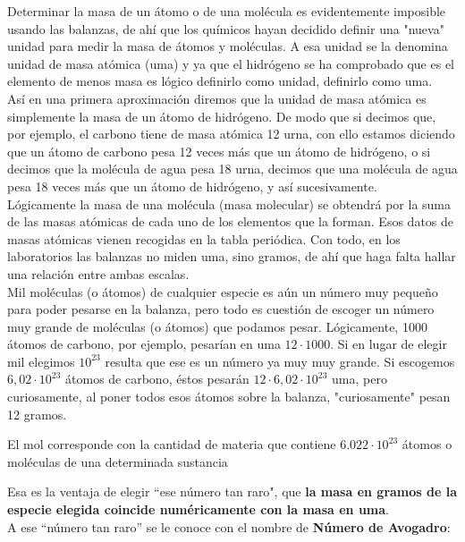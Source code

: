 Determinar la masa de un átomo o de una molécula es evidentemente imposible usando las balanzas, de ahí que los químicos hayan decidido definir una "nueva" unidad para medir la masa de átomos y moléculas. A esa unidad se la denomina unidad de masa atómica (uma) y ya que el hidrógeno se ha comprobado que es el elemento de menos masa es lógico definirlo como unidad, definirlo como uma.\\

Así en una primera aproximación diremos que la unidad de masa atómica es simplemente la masa de un átomo de hidrógeno. De modo que si decimos que, por ejemplo, el carbono tiene de masa atómica 12 urna, con ello estamos diciendo que un átomo de carbono pesa 12 veces más que un átomo de hidrógeno, o si decimos que la molécula de agua pesa 18 urna, decimos que una molécula de agua pesa 18 veces más que un átomo de hidrógeno, y así sucesivamente.\\

Lógicamente la masa de una molécula (masa molecular) se obtendrá por la suma de las masas atómicas de cada uno de los elementos que la forman. Esos datos de masas atómicas vienen recogidas en la tabla periódica. Con todo, en los laboratorios las balanzas no miden uma, sino gramos, de ahí que haga falta hallar una relación entre ambas escalas.\\


Mil moléculas (o átomos) de cualquier especie es aún un número muy pequeño para poder pesarse en la balanza, pero todo es cuestión de escoger un número muy grande de moléculas (o átomos) que podamos pesar. Lógicamente, 1000 átomos de carbono, por ejemplo, pesarían en uma $12\cdot 1000$. Si en lugar de elegir mil elegimos $10^{23}$ resulta que ese es un número ya muy muy grande. Si escogemos $6,02\cdot10^{23}$ átomos de carbono, éstos pesarán $12\cdot6,02\cdot10^23$ uma, pero curiosamente, al poner todos esos átomos sobre la balanza, "curiosamente" pesan 12 gramos.\\

\begin{definition}[Mol]
	El mol corresponde con la cantidad de materia que contiene $6.022\cdot10^{23}$ átomos o moléculas de una determinada sustancia
\end{definition}

Esa es la ventaja de elegir “ese número tan raro", que \textbf{la masa en gramos de la especie elegida coincide numéricamente con la masa en uma}.\\
A ese “número tan raro” se le conoce con el nombre de \textbf{Número de Avogadro}:\\

